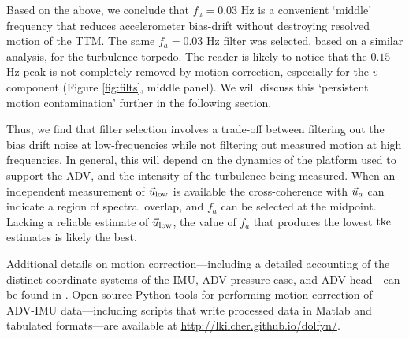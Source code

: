 Based on the above, we conclude that $f_a = 0.03$ Hz is a convenient `middle' frequency that reduces accelerometer bias-drift without destroying resolved motion of the TTM.  The same $f_a=0.03$ Hz filter was selected, based on a similar analysis, for the turbulence torpedo. The reader is likely to notice that the $0.15$ Hz peak is not completely removed by motion correction, especially for the $v$ component (Figure \ref{fig:filts}, middle panel). We will discuss this `persistent motion contamination' further in the following section.

Thus, we find that filter selection involves a trade-off between filtering out the bias drift noise at low-frequencies while not filtering out measured motion at high frequencies. In general, this will depend on the dynamics of the platform used to support the ADV, and the intensity of the turbulence being measured. When an independent measurement of $\ulow$ is available the cross-coherence with $\uacc$ can indicate a region of spectral overlap, and $f_a$ can be selected at the midpoint. Lacking a reliable estimate of $\ulow$,  the value of $f_a$ that produces the lowest $\mathrm{tke}$ estimates is likely the best. 

Additional details on motion correction---including a detailed accounting of the distinct coordinate systems of the IMU, ADV pressure case, and ADV head---can be found in \cite{Kilcher++2016}. Open-source Python tools for performing motion correction of ADV-IMU data---including scripts that write processed data in Matlab and tabulated formats---are available at \url{http://lkilcher.github.io/dolfyn/}.

\def\ue{\ensuremath{\vec{u}\earth}}

